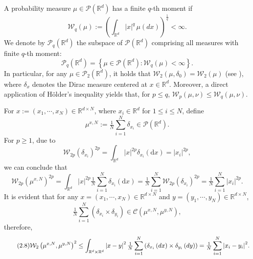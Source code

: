 \documentclass[12pt]{article}
\numberwithin{equation}{section}
\begin{document}
A probability measure $\mu \in \mathcal{P}\left(\mathbb{R}^d\right)$ has a finite $q$-th moment if
\begin{equation}\tag{2.2}\label{2.2}
\mathcal{W}_q\left(\mu\right) := \left( \int_{\mathbb{R}^d} \left|x\right|^q \, \mu\left(dx\right) \right)^{\frac{1}{q}} < \infty.
\end{equation}
We denote by $\mathcal{P}_q\left(\mathbb{R}^d\right)$ the subspace of $\mathcal{P}\left(\mathbb{R}^d\right)$ comprising all measures with finite $q$-th moment:
\begin{equation}\tag{2.3}\label{2.3}
\mathcal{P}_q(\mathbb{R}^d) = \left\{ \mu \in \mathcal{P}(\mathbb{R}^d) : \mathcal{W}_q(\mu) < \infty \right\}.
\end{equation}
In particular, for any $\mu \in \mathcal{P}_2(\mathbb{R}^d)$, it holds that $\mathcal{W}_2(\mu, \delta_0) = \mathcal{W}_2(\mu)$ (see \cite[Lemma~2.3]{GDReis2019Freidlin-Wentzell}), where $\delta_x$ denotes the Dirac measure centered at $x \in \mathbb{R}^d$. Moreover, a direct application of
H\"{o}lder’s inequality yields that, for $p \leq q$,  $\mathcal{W}_p\left( \mu ,\nu \right) \leq \mathcal{W}_q\left( \mu ,\nu \right)$.

For $x:=\left(x_1, \cdots, x_N\right) \in \mathbb{R}^{d\times N}$, where $x_i \in \mathbb{R}^d$ for $1 \leq i \leq N$, define
\begin{equation}\tag{2.4}\label{2.4}
\mu ^{x,N}:=\tfrac{1}{N}\sum_{i=1}^N{\delta _{x_i}}\in \mathcal{P} \left( \mathbb{R}^d \right).
\end{equation}
For $p\geq 1 $, due to
\begin{equation}\tag{2.5}\label{2.5}
\mathcal{W}_{2p}\left( \delta _{x_i} \right) ^{2p}=\int_{\mathbb{R} ^d}\left|x\right|^{2p}\delta _{x_i}\left(\mathrm{d}x\right)=\left|x_i\right|^{2p},
\end{equation}
we can conclude that
\begin{equation}\tag{2.6}\label{2.6}
\mathcal{W}_{2p}\left( \mu ^{x,N} \right) ^{2p}=\int_{\mathbb{R} ^d}\left|x\right|^{2p}\tfrac{1}{N}\sum_{i=1}^N{\delta _{x_i}}\left(\mathrm{d}x\right)=\tfrac{1}{N}\sum_{i=1}^N{\mathcal{W}_{2p}\left( \delta _{x_i} \right) ^{2p}}=\tfrac{1}{N}\sum_{i=1}^N{\left|x_i\right|^{2p}}.
\end{equation}
It is evident that for any $x=\left(x_1, \cdots, x_N\right) \in \mathbb{R}^{d\times N}$ and $y=\left(y_1, \cdots, y_N\right) \in \mathbb{R}^{d\times N}$,
\begin{equation}\tag{2.7}\label{2.7}
\tfrac{1}{N}\sum_{i=1}^N{\left( \delta_{x_i}\times\delta_{y_i}\right)}\in\mathcal{C} \left(\mu^{x,N},\mu^{y,N}\right) ,
\end{equation}
therefore,
\begin{equation}\tag{2.8}\label{2.8}
\mathcal{W}_{2}\left( \mu ^{x,N},\mu ^{y,N} \right)^{2}
\leq \int_{\mathbb{R} ^d\times \mathbb{R} ^d}\left|x-y\right|^2\tfrac{1}{N}\sum_{i=1}^N{\left( \delta _{x_i}\left( dx \right) \times \delta _{y_i}\left( dy \right) \right)}\\
=\tfrac{1}{N}\sum_{i=1}^N{\left| x_i-y_i \right|^2}.
\end{equation}
\end{document}
